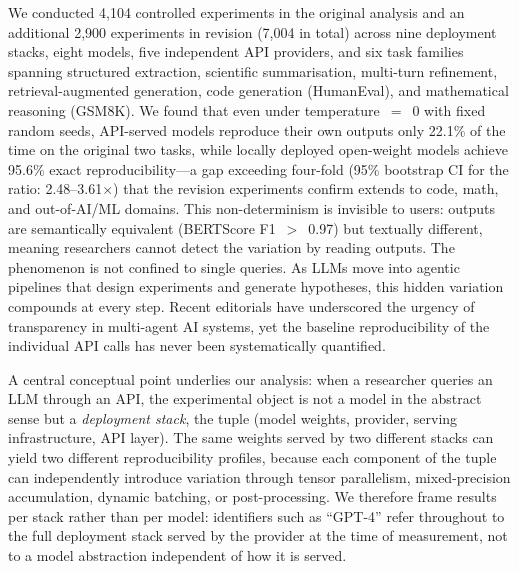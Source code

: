 \documentclass[sn-nature]{sn-jnl}
\begin{document}
We conducted 4,104 controlled experiments in the original analysis and an additional 2,900 experiments in revision (7,004 in total) across nine deployment stacks, eight models, five independent API providers, and six task families spanning structured extraction, scientific summarisation, multi-turn refinement, retrieval-augmented generation, code generation (HumanEval), and mathematical reasoning (GSM8K).
We found that even under temperature~$=$~0 with fixed random seeds, API-served models reproduce their own outputs only 22.1\% of the time on the original two tasks, while locally deployed open-weight models achieve 95.6\% exact reproducibility---a gap exceeding four-fold (95\% bootstrap CI for the ratio: 2.48--3.61$\times$) that the revision experiments confirm extends to code, math, and out-of-AI/ML domains.
This non-determinism is invisible to users: outputs are semantically equivalent (BERTScore F1~$>$~0.97) but textually different, meaning researchers cannot detect the variation by reading outputs.
The phenomenon is not confined to single queries.
As LLMs move into agentic pipelines that design experiments and generate hypotheses\cite{xin2025agentic}, this hidden variation compounds at every step.
Recent editorials have underscored the urgency of transparency in multi-agent AI systems\cite{editorial2026multiagent}, yet the baseline reproducibility of the individual API calls has never been systematically quantified.

A central conceptual point underlies our analysis: when a researcher queries an LLM through an API, the experimental object is not a model in the abstract sense but a \emph{deployment stack}, the tuple (model weights, provider, serving infrastructure, API layer).
The same weights served by two different stacks can yield two different reproducibility profiles, because each component of the tuple can independently introduce variation through tensor parallelism, mixed-precision accumulation, dynamic batching, or post-processing.
We therefore frame results per stack rather than per model: identifiers such as ``GPT-4'' refer throughout to the full deployment stack served by the provider at the time of measurement, not to a model abstraction independent of how it is served.
\end{document}
